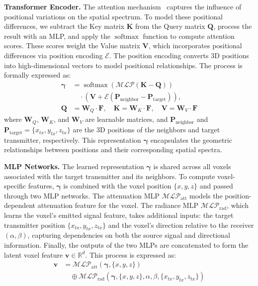 \textbf{Transformer Encoder.}  
The attention mechanism~\cite{gheini2021cross} captures the influence of positional variations on the spatial spectrum. 
To model these positional differences, we subtract the Key matrix \( \mathbf{K} \) from the Query matrix \( \mathbf{Q} \), process the result with an MLP, and apply the \(\operatorname{softmax}\) function to compute attention scores. 
These scores weight the Value matrix \( \mathbf{V} \), which incorporates positional differences via position encoding \( \mathcal{E} \). 
The position encoding converts 3D positions into high-dimensional vectors to model positional relationships.
The process is formally expressed as:
\begin{equation}
\label{eqn_cross_att}
\begin{aligned}
\boldsymbol{\gamma} &= \operatorname{softmax}\left( \mathcal{MLP}\left(\mathbf{K} - \mathbf{Q}\right) \right) \\
&\quad \cdot \left(\mathbf{V} + \mathcal{E}\left(\mathbf{P}_{\text{neighbor}} - \mathbf{P}_{\text{target}}\right)\right), \\
\mathbf{Q} &= \mathbf{W}_Q \cdot \mathbf{F}, \quad \mathbf{K} = \mathbf{W}_K \cdot \mathbf{F}, \quad \mathbf{V} = \mathbf{W}_V \cdot \mathbf{F}
\end{aligned}
\end{equation}
where \( \mathbf{W}_Q \), \( \mathbf{W}_K \), and \( \mathbf{W}_V \) are learnable matrices, and \( \mathbf{P}_{\text{neighbor}} \) and \( \mathbf{P}_{\text{target}} = \{x_{tx}, y_{tx}, z_{tx}\} \) are the 3D positions of the neighbors and target transmitter, respectively. 
This representation \( \boldsymbol{\gamma} \) encapsulates the geometric relationships between positions and their corresponding spatial spectra.



\textbf{MLP Networks.}  
The learned representation \( \boldsymbol{\gamma} \) is shared across all voxels associated with the target transmitter and its neighbors. 
To compute voxel-specific features, \( \boldsymbol{\gamma} \) is combined with the voxel position \( \{x, y, z\} \) and passed through two MLP networks.
The attenuation MLP \( \mathcal{MLP}_{\text{att}} \) models the position-dependent attenuation feature for the voxel. 
The radiance MLP \( \mathcal{MLP}_{\text{rad}} \), which learns the voxel's emitted signal feature, takes additional inputs: the target transmitter position \( \{x_{tx}, y_{tx}, z_{tx}\} \) and the voxel's direction relative to the receiver \( (\alpha, \beta) \), capturing dependencies on both the source signal and directional information.
Finally, the outputs of the two MLPs are concatenated to form the latent voxel feature \( \mathbf{v} \in \mathbb{R}^d \). 
This process is expressed as:
\begin{equation}
\label{eqn_mlp_con}
\begin{aligned}
\mathbf{v} &= \mathcal{MLP}_{\text{att}}\left(\boldsymbol{\gamma}, \{x, y, z\}\right) \\
&\quad \oplus \mathcal{MLP}_{\text{rad}}\left(\boldsymbol{\gamma}, \{x, y, z\}, \alpha, \beta, \{x_{tx}, y_{tx}, z_{tx}\}\right)
\end{aligned}
\end{equation}



